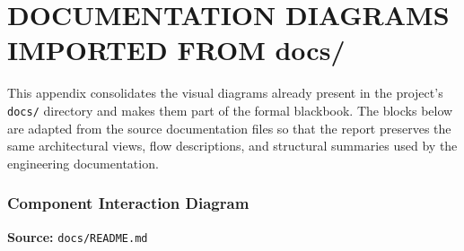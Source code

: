 \chapter{DOCUMENTATION DIAGRAMS IMPORTED FROM docs/}
This appendix consolidates the visual diagrams already present in the project's \texttt{docs/} directory and makes them part of the formal blackbook. The blocks below are adapted from the source documentation files so that the report preserves the same architectural views, flow descriptions, and structural summaries used by the engineering documentation.

\subsection{Component Interaction Diagram}
\textbf{Source:} \texttt{docs/README.md}
